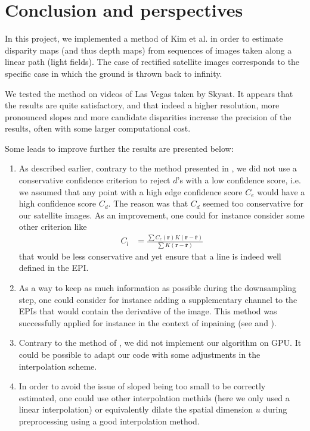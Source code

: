 \documentclass{article}
\theoremstyle{definition}
\begin{document}
\clearpage
\section{Conclusion and perspectives}


In this project, we implemented a method of Kim et al. in order to estimate disparity maps (and thus depth maps) from sequences of images taken along a linear path (light fields). The case of rectified satellite images corresponds to the specific case in which the ground is thrown back to infinity.


We tested the method on videos of Las Vegas taken by Skysat. It appears that the results are quite satisfactory, and that indeed a higher resolution, more pronounced slopes and more candidate disparities increase the precision of the results, often with some larger computational cost. 


Some leads to improve further the results are presented below:
\begin{enumerate}
 \item As described earlier, contrary to the method presented in \cite{art:kim13:lfields}, we did not use a conservative confidence criterion to reject $d$'s with a low confidence score, i.e. we assumed that any point with a high edge confidence score $C_e$ would have a high confidence score $C_d$. The reason was that $C_d$ seemed too conservative for our satellite images. As an improvement, one could for instance consider some other criterion like
 \begin{align}
  C_l &= \frac{\sum C_e(\mathbf{r}) K(\mathbf{r} - \overline{\mathbf{r}})}{\sum K(\mathbf{r} - \overline{\mathbf{r}})}
 \end{align}
 that would be less conservative and yet ensure that a line is indeed well defined in the EPI.
 \item As a way to keep as much information as possible during the downsampling step, one could consider for instance adding a supplementary channel to the EPIs that would contain the derivative of the image. This method was successfully applied for instance in the context of inpaining (see \cite{art:liu:deriv} and \cite{art:newson:deriv}).
 \item Contrary to the method of \cite{art:kim13:lfields}, we did not implement our algorithm on GPU. It could be possible to adapt our code with some adjustments in the interpolation scheme.
 \item In order to avoid the issue of sloped being too small to be correctly estimated, one could use other interpolation methids (here we only used a linear interpolation) or equivalently dilate the spatial dimension $u$ during preprocessing using a good interpolation method.
\end{enumerate}
\end{document}
